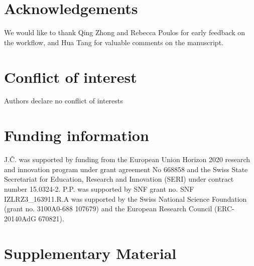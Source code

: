 \documentclass[num-refs]{wiley-article}
\newcommand{\beginsupplement}{%
	\setcounter{table}{0}
	\renewcommand{\thetable}{S\arabic{table}}%
	\setcounter{figure}{0}
	\renewcommand{\thefigure}{S\arabic{figure}}%
}
\begin{document}
\section*{Acknowledgements}
We would like to thank Qing Zhong and Rebecca Poulos for early feedback on the workflow, and Hua Tang for valuable comments on the manuscript. 

\section*{Conflict of interest}
Authors declare no conflict of interests

\section*{Funding information}
J.Č. was supported by funding from the European Union Horizon 2020 research and innovation program under grant agreement No 668858 and the Swiss State Secretariat for Education, Research and Innovation (SERI) under contract number 15.0324-2. P.P. was supported by SNF grant no. SNF IZLRZ3\_163911.R.A was supported by the Swiss National Science Foundation (grant no. 3100A0-688 107679) and the European Research Council (ERC-20140AdG 670821).

\printendnotes




\newpage
\section{Supplementary Material}
\beginsupplement
\end{document}
